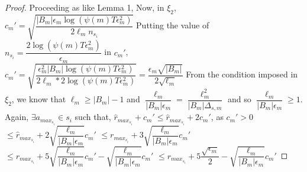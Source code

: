 \begin{proof}
\newline
Proceeding as like Lemma 1,
\newline
\newline Now, in $\xi_{2}$, $c_{m}'=\sqrt{\dfrac{|B_{m}|\epsilon_{m}\log (\psi(m)T\epsilon_{m}^{2})}{2\ell_{m} n_{s_{i}}}}$
\newline Putting the value of $n_{s_{i}}=\dfrac{2\log{(\psi(m)T\epsilon_{m}^{2})}}{\epsilon_{m}}$ in $c_{m}'$,
\newline $c_{m}'=\sqrt{\dfrac{\epsilon_{m}^{2}|B_{m}|\log (\psi(m)T\epsilon_{m}^{2})}{2\ell_{m}*2 \log(\psi(m)T\epsilon_{m}^{2})}}=\dfrac{\epsilon_{m}\sqrt{|B_{m}|}}{2\sqrt{\ell_{m}}}$
\newline From the condition imposed in $\xi_{2}$, we know that $\ell_{m}\geq |B_{m}|-1$ and $\dfrac{\ell_{m}}{|B_{m}|\epsilon_{m}}=\dfrac{\ell_{m}^{2}}{|B_{m}|\Delta_{s,m}}$ and so $\dfrac{\ell_{m}}{|B_{m}|\epsilon_{m}}\geq 1$.
\newline Again, $\exists a_{max_{s_{i}}} \in s_{i}$ such that, 
$\hat{r}_{max_{s_{i}}} + c_{m}'\leq \hat{r}_{max_{s_{i}}} + 2c_{m}'$, as $c_{m}' > 0$
\newline\hspace*{14em}$\leq\hat{r}_{max_{s_{i}}} + 2\sqrt{\dfrac{\ell_{m}}{|B_{m}|\epsilon_{m}}}c_{m}' $
\newline\hspace*{14em}$\leq r_{max_{s_{i}}} + 3\sqrt{\dfrac{\ell_{m}}{|B_{m}|\epsilon_{m}}}c_{m}'$
\newline\hspace*{14em}$\leq r_{max_{s_{i}}} + 5\sqrt{\dfrac{\ell_{m}}{|B_{m}|\epsilon_{m}}}c_{m}'-\sqrt{\dfrac{\ell_{m}}{|B_{m}|\epsilon_{m}}}c_{m}'$
\newline\hspace*{14em}$\leq r_{max_{s_{i}}} + 5\dfrac{\sqrt{\epsilon_{m}}}{2}-\sqrt{\dfrac{\ell_{m}}{|B_{m}|\epsilon_{m}}}c_{m}'$

\end{proof}
